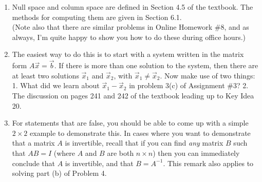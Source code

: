 \documentclass[letterpaper,12pt]{amsart}
\begin{document}
\begin{enumerate}
 \item Null space and column space are defined in Section 4.5 of the textbook. The methods for computing them are given in Section 6.1.\\
(Note also that there are similar problems in Online Homework \#8, and as always, I'm quite happy to show you how to do these during office hours.)

\bigskip

 \item The easiest way to do this is to start with a system written in the matrix form $A\vec{x}=\vec{b}$. If there is more than one solution to the system, then there are at least two solutions $\vec{x}_1$ and $\vec{x}_2$, with $\vec{x}_1\neq \vec{x}_2$. Now make use of two things: 1. What did we learn about $\vec{x}_1-\vec{x}_2$ in problem 3(c) of Assignment \#3? 2. The discussion on pages 241 and 242 of the textbook leading up to Key Idea 20.

\bigskip

 \item For statements that are false, you should be able to come up with a simple $2\times 2$ example to demonstrate this. In cases where you want to demonstrate that a matrix $A$ is invertible, recall that if you can find {\em any} matrix $B$ such that $AB=I$ (where $A$ and $B$ are both $n\times n$) then you can immediately conclude that $A$ is invertible, and that $B=A^{-1}$. This remark also applies to solving part (b) of Problem 4.

\end{enumerate}
\end{document}
